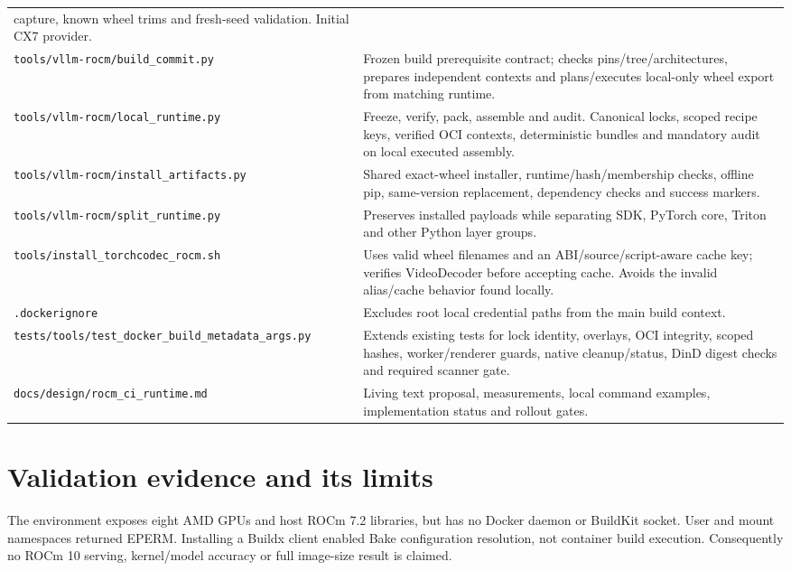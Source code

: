 \documentclass[11pt,a4paper]{article}
\newcommand{\file}[1]{\nolinkurl{#1}}
\begin{document}
{\begin{longtable}{L{64mm}L{85mm}}
capture, known wheel trims and fresh-seed validation. Initial CX7 provider. \\
\file{tools/vllm-rocm/build_commit.py} & Frozen build prerequisite contract;
checks pins/tree/architectures, prepares independent contexts and plans/executes
local-only wheel export from matching runtime. \\
\file{tools/vllm-rocm/local_runtime.py} & Freeze, verify, pack, assemble and
audit. Canonical locks, scoped recipe keys, verified OCI contexts, deterministic
bundles and mandatory audit on local executed assembly. \\
\file{tools/vllm-rocm/install_artifacts.py} & Shared exact-wheel installer,
runtime/hash/membership checks, offline pip, same-version replacement,
dependency checks and success markers. \\
\file{tools/vllm-rocm/split_runtime.py} & Preserves installed payloads while
separating SDK, PyTorch core, Triton and other Python layer groups. \\
\file{tools/install_torchcodec_rocm.sh} & Uses valid wheel filenames and an
ABI/source/script-aware cache key; verifies VideoDecoder before accepting cache.
Avoids the invalid alias/cache behavior found locally. \\
\file{.dockerignore} & Excludes root local credential paths from the main
build context. \\
\file{tests/tools/test_docker_build_metadata_args.py} & Extends existing tests
for lock identity, overlays, OCI integrity, scoped hashes, worker/renderer guards,
native cleanup/status, DinD digest checks and required scanner gate. \\
\file{docs/design/rocm_ci_runtime.md} & Living text proposal, measurements,
local command examples, implementation status and rollout gates. \\
\bottomrule
\end{longtable}}

\section{Validation evidence and its limits}

The environment exposes eight AMD GPUs and host ROCm 7.2 libraries, but has no
Docker daemon or BuildKit socket. User and mount namespaces returned EPERM.
Installing a Buildx client enabled Bake configuration resolution, not container
build execution. Consequently no ROCm 10 serving, kernel/model accuracy or full
image-size result is claimed.
\end{document}
